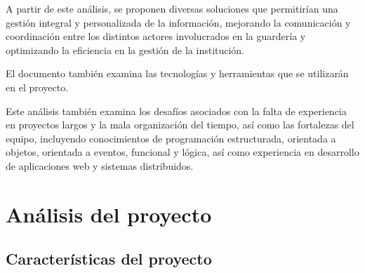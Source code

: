 \documentclass{article}
\begin{document}
A partir de este análisis, se proponen diversas soluciones que permitirían una gestión integral y personalizada de la información, mejorando la comunicación y coordinación entre los distintos actores involucrados en la guardería y optimizando la eficiencia en la gestión de la institución.

El documento también examina las tecnologías y herramientas que se utilizarán en el proyecto.

Este análisis también examina los desafíos asociados con la falta de experiencia en proyectos largos y la mala organización del tiempo, así como las fortalezas del equipo, incluyendo conocimientos de programación estructurada, orientada a objetos, orientada a eventos, funcional y lógica, así como experiencia en desarrollo de aplicaciones web y sistemas distribuidos.

\section{Análisis del proyecto}
\subsection{Características del proyecto}
\end{document}

